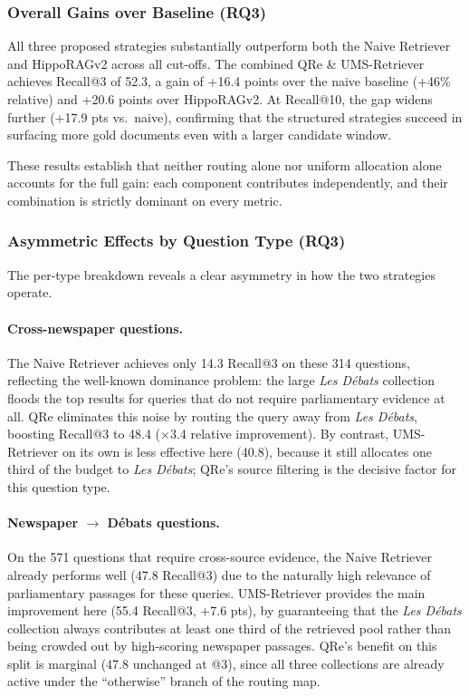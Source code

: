 \subsubsection{Overall Gains over Baseline (\textbf{RQ3})}
\label{sec:results-overall}

All three proposed strategies substantially outperform both the Naive Retriever
and HippoRAGv2 across all cut-offs.
The combined QRe \& UMS-Retriever achieves Recall@3 of 52.3, a gain of +16.4 points over the naive baseline (+46\% relative) and +20.6 points over HippoRAGv2.
At Recall@10, the gap widens further (+17.9 pts vs.\ naive), confirming that
the structured strategies succeed in surfacing more gold documents even with
a larger candidate window.

These results establish that neither routing alone nor uniform allocation alone
accounts for the full gain: each component contributes independently, and their
combination is strictly dominant on every metric.

\subsubsection{Asymmetric Effects by Question Type (\textbf{RQ3})}
\label{sec:results-asymmetric}

The per-type breakdown reveals a clear asymmetry in how the two strategies operate.

\paragraph{Cross-newspaper questions.}
The Naive Retriever achieves only 14.3 Recall@3 on these 314 questions, reflecting
the well-known dominance problem: the large \textit{Les Débats} collection floods
the top results for queries that do not require parliamentary evidence at all.
QRe eliminates this noise by routing the query away from \textit{Les Débats},
boosting Recall@3 to 48.4 ($\times$3.4 relative improvement).
By contrast, UMS-Retriever on its own is less effective here (40.8), because
it still allocates one third of the budget to \textit{Les Débats};
QRe's source filtering is the decisive factor for this question type.

\paragraph{Newspaper $\rightarrow$ Débats questions.}
On the 571 questions that require cross-source evidence, the Naive Retriever already
performs well (47.8 Recall@3) due to the naturally high relevance of parliamentary
passages for these queries.
UMS-Retriever provides the main improvement here (55.4 Recall@3, +7.6 pts),
by guaranteeing that the \textit{Les Débats} collection always contributes at
least one third of the retrieved pool rather than being crowded out by
high-scoring newspaper passages.
QRe's benefit on this split is marginal (47.8 unchanged at @3), since all three
collections are already active under the ``otherwise'' branch of the routing map.

